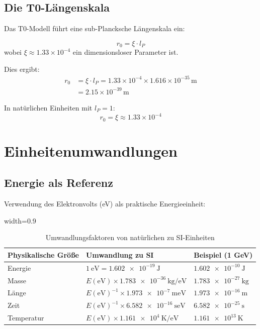 	\subsection{Die T0-Längenskala}
	
	Das T0-Modell führt eine sub-Plancksche Längenskala ein:
	
	\begin{definition}[T0-Länge]
		\begin{equation}
			r_0 = \xi \cdot l_P
		\end{equation}
		wobei $\xi \approx 1.33 \times 10^{-4}$ ein dimensionsloser Parameter ist.
	\end{definition}
	
	Dies ergibt:
	\begin{align}
		r_0 &= \xi \cdot l_P = 1.33 \times 10^{-4} \times 1.616 \times 10^{-35}\,\text{m} \\
		&= 2.15 \times 10^{-39}\,\text{m}
	\end{align}
	
	In natürlichen Einheiten mit $l_P = 1$:
	\begin{equation}
		r_0 = \xi \approx 1.33 \times 10^{-4}
	\end{equation}
	
	\section{Einheitenumwandlungen}
	
	\subsection{Energie als Referenz}
	
	Verwendung des Elektronvolts (eV) als praktische Energieeinheit:
	
	\begin{table}[htbp]
		\centering
		\begin{adjustbox}{width=0.9\textwidth}
			\begin{tabular}{lll}
				\toprule
				\textbf{Physikalische Größe} & \textbf{Umwandlung zu SI} & \textbf{Beispiel (1 GeV)} \\
				\midrule
				Energie & $\SI{1}{\electronvolt} = \SI{1.602e-19}{\joule}$ & $\SI{1.602e-10}{\joule}$ \\
				Masse & $E(\text{eV}) \times \SI{1.783e-36}{\kilogram\per\electronvolt}$ & $\SI{1.783e-27}{\kilogram}$ \\
				Länge & $E(\text{eV})^{-1} \times \SI{1.973e-7}{\meter\electronvolt}$ & $\SI{1.973e-16}{\meter}$ \\
				Zeit & $E(\text{eV})^{-1} \times \SI{6.582e-16}{\second\electronvolt}$ & $\SI{6.582e-25}{\second}$ \\
				Temperatur & $E(\text{eV}) \times \SI{1.161e4}{\kelvin\per\electronvolt}$ & $\SI{1.161e13}{\kelvin}$ \\
				\bottomrule
			\end{tabular}
		\end{adjustbox}
		\caption{Umwandlungsfaktoren von natürlichen zu SI-Einheiten}
		\label{tab:umwandlungen}
	\end{table}
	
